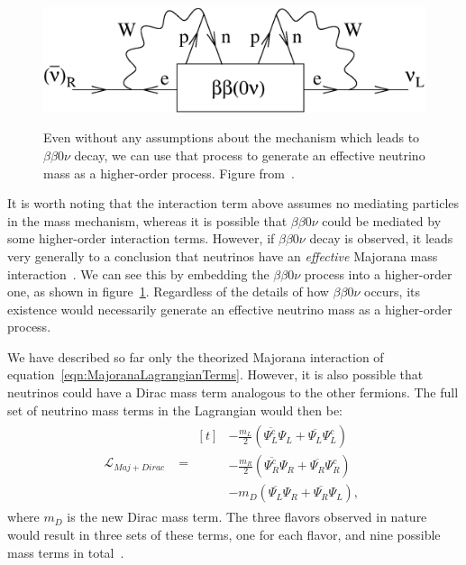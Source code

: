 \begin{figure}
\begin{center}
\includegraphics[keepaspectratio=true,width=\textwidth]{Avignone_fig03.eps}
\end{center}
\renewcommand{\baselinestretch}{1}
\small\normalsize
\begin{quote}
\caption{Even without any assumptions about the mechanism which leads to $\beta\beta 0\nu$ decay, we can use that process to generate an effective neutrino mass as a higher-order process.  Figure from~\cite{RMPbb0n}.}
\label{fig:FeynmanBetaBeta0NuImplication}
\end{quote}
\end{figure}
\renewcommand{\baselinestretch}{2}
\small\normalsize

It is worth noting that the interaction term above assumes no mediating particles in the mass mechanism, whereas it is possible that $\beta\beta 0\nu$ could be mediated by some higher-order interaction terms.  However, if $\beta\beta 0\nu$ decay is observed, it leads very generally to a conclusion that neutrinos have an \emph{effective} Majorana mass interaction~\cite{BlackBoxTheorem}.  We can see this by embedding the $\beta\beta 0\nu$ process into a higher-order one, as shown in figure~\ref{fig:FeynmanBetaBeta0NuImplication}.  Regardless of the details of how $\beta\beta 0\nu$ occurs, its existence would necessarily generate an effective neutrino mass as a higher-order process.

We have described so far only the theorized Majorana interaction of equation~\ref{eqn:MajoranaLagrangianTerms}.  However, it is also possible that neutrinos could have a Dirac mass term analogous to the other fermions.  The full set of neutrino mass terms in the Lagrangian would then be:
\begin{align}
\mathcal{L}_{Maj+Dirac}&= \begin{aligned}[t]
 & -\frac{m_{L}}{2} \left( \overline{\Psi_L^c} \Psi_L^{} + \overline{\Psi_L^{}} \Psi_L^c \right)\\
 & -\frac{m_{R}}{2} \left( \overline{\Psi_R^c} \Psi_R^{} + \overline{\Psi_R^{}} \Psi_R^c \right)\\
 & -m_D \left(\overline{\Psi_L}\Psi_R + \overline{\Psi_R}\Psi_L\right),
\end{aligned}
\end{align}
where $m_D$ is the new Dirac mass term.  The three flavors observed in nature would result in three sets of these terms, one for each flavor, and nine possible mass terms in total~\cite{RMPbb0n}.

